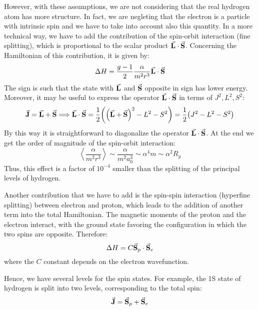 \documentclass[../../main/main.tex]{subfiles}
\begin{document}
However, with these assumptions, we are not considering that the real hydrogen atom has more structure. In fact, we are negleting that the electron is a particle with intrinsic spin and we have to take into account also this quantity. In a more technical way, we have to add the contribution of the spin-orbit interaction (fine splitting), which is proportional to the scalar product \( \va{L} \cdot \va{S} \). Concerning the Hamiltonian of this contribution, it is given by:
\begin{equation}
    \Delta H
    =
    \frac{g-1}{2} \frac{\alpha}{m^2 r^3} \va{L} \cdot \va{S}
    \label{eq:L02_HASOHC}
\end{equation}
The sign is such that the state with \( \va{L} \) and \( \va{S} \) opposite in sign has lower energy. Moreover, it may be useful to express the operator \( \va{L} \cdot \va{S} \) in terms of \( J^2, L^2, S^2 \):
\begin{equation}
    \va{J} = \va{L} + \va{S}
    \Longrightarrow
    \va{L} \cdot \va{S} = \frac{1}{2} \qty(\qty(\va{L} + \va{S})^2 - L^2 - S^2)
    =
    \frac{1}{2} \qty(J^2 - L^2 - S^2)
    \label{eq:L02_HASOT}
\end{equation}
By this way it is straightforward to diagonalize the operator \( \va{L} \cdot \va{S} \). At the end we get the order of magnitude of the spin-orbit interaction:
\begin{equation}
    \left\langle \frac{\alpha}{m^2 r^3} \right\rangle
    \sim
    \frac{\alpha}{m^2 a_0^3}
    \sim
    \alpha^4 m
    \sim
    \alpha^2 R_y
    \label{eq:L02_HASOOM}
\end{equation}
Thus, this effect is a factor of \( 10^{-4} \) smaller than the splitting of the principal levels of hydrogen.

Another contribution that we have to add is the spin-spin interaction (hyperfine splitting) between electron and proton, which leads to the addition of another term into the total Hamiltonian. The magnetic moments of the proton and the electron interact, with the ground state favoring the configuration in which the two spins are opposite. Therefore:
\begin{equation}
    \Delta H
    =
    C \va{S}_p \cdot \va{S}_e
    \label{eq:L02_HASSHC}
\end{equation}
where the \( C \) constant depends on the electron wavefunction.

Hence, we have several levels for the spin states. For example, the 1S state of hydrogen is split into two levels, corresponding to the total spin:
\begin{equation}
    \va{J} = \va{S}_p + \va{S}_e
    \label{eq:}
\end{equation}
\end{document}
